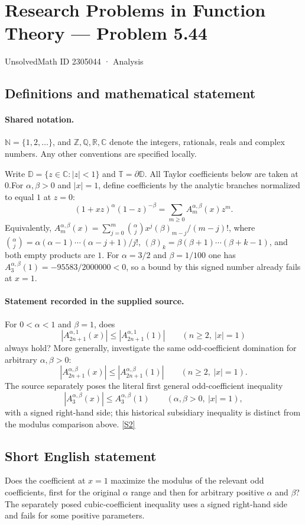 \documentclass[11pt]{article}
\newcommand{\sref}[2]{\hyperlink{source:#1:#2}{[S#2]}}
\begin{document}
\setcounter{section}{2305043}
\section{Research Problems in Function Theory — Problem 5.44}\label{2305044}
{\small\sffamily UnsolvedMath ID 2305044 · Analysis}
\subsection{Definitions and mathematical statement}

\paragraph{Shared notation.}$\mathbb N=\{1,2,\ldots\}$, and $\mathbb Z,\mathbb Q,\mathbb R,\mathbb C$ denote the integers, rationals, reals and complex numbers. Any other conventions are specified locally.


Write $\mathbb D=\{z\in\mathbb C:|z|<1\}$ and $\mathbb T=\partial\mathbb D$. All Taylor coefficients below are taken at $0$.For $\alpha,\beta>0$ and $|x|=1$, define coefficients by the analytic branches normalized to equal $1$ at $z=0$:
\[(1+xz)^\alpha(1-z)^{-\beta}=\sum_{m\ge0}A_m^{\alpha,\beta}(x)z^m.
\]
Equivalently, $A_m^{\alpha,\beta}(x)=\sum_{j=0}^m\binom\alpha j x^j(\beta)_{m-j}/(m-j)!$, where $\binom\alpha j=\alpha(\alpha-1)\cdots(\alpha-j+1)/j!$, $(\beta)_k=\beta(\beta+1)\cdots(\beta+k-1)$, and both empty products are $1$. For $\alpha=3/2$ and $\beta=1/100$ one has $A_3^{\alpha,\beta}(1)=-95583/2000000<0$, so a bound by this signed number already fails at $x=1$.
\paragraph{Statement recorded in the supplied source.}
For $0<\alpha<1$ and $\beta=1$, does
\[|A_{2n+1}^{\alpha,1}(x)|\le |A_{2n+1}^{\alpha,1}(1)|\qquad(n\ge2,\ |x|=1)\]
always hold? More generally, investigate the same odd-coefficient domination for arbitrary $\alpha,\beta>0$:
\[|A_{2n+1}^{\alpha,\beta}(x)|\le |A_{2n+1}^{\alpha,\beta}(1)|\qquad(n\ge2,\ |x|=1).\]
The source separately poses the literal first general odd-coefficient inequality
\[|A_3^{\alpha,\beta}(x)|\le A_3^{\alpha,\beta}(1)\qquad(\alpha,\beta>0,\ |x|=1),\]
with a signed right-hand side; this historical subsidiary inequality is distinct from the modulus comparison above. \sref{2305044}{2}
\subsection{Short English statement}
Does the coefficient at $x=1$ maximize the modulus of the relevant odd coefficients, first for the original $\alpha$ range and then for arbitrary positive $\alpha$ and $\beta$? The separately posed cubic-coefficient inequality uses a signed right-hand side and fails for some positive parameters.
\end{document}
